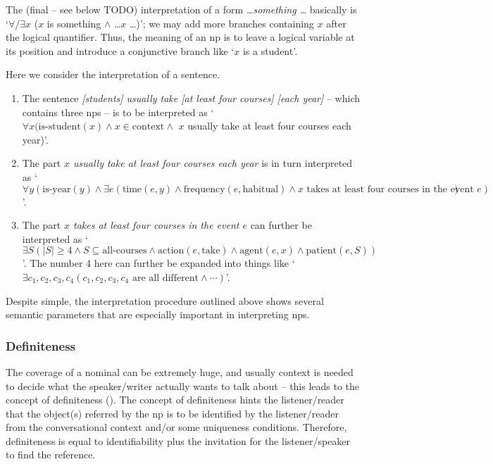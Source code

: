 \documentclass[UTF8, a4paper, oneside, scheme=plain]{ctexrep}
\newcommand{\corpus}[1]{\emph{#1}}
\newcommand{\translate}[1]{`#1'}
\begin{document}
The (final -- see below TODO) 
interpretation of a form \corpus{\dots something \dots} basically is 
\translate{$\forall/\exists x$ ($x$ is something $\land$ \dots $x$ \dots)};
we may add more branches containing $x$ after the logical quantifier.
Thus, the meaning of an \acs{np} 
is to leave a logical variable at its position
and introduce a conjunctive branch like \translate{$x$ is a student}. 

Here we consider the interpretation of a sentence.
\begin{enumerate}
    \item The sentence \corpus{[students] usually take [at least four courses] [each year]}
    -- which contains three \acs{np}s -- 
    is to be interpreted as 
    \translate{$\forall x (
        \text{is-student} (x) \land 
        x \in \text{context} \land$
        $x$ usually take at least four courses each year)}.
    \item The part \corpus{$x$ usually take at least four courses each year} 
    is in turn interpreted as 
    \translate{$\forall y (
        \text{is-year}(y) \land 
        \exists e (
            \text{time}(e, y) \land 
            \text{frequency} (e, \text{habitual}) \land 
            \text{$x$ takes at least four courses in the event $e$})
    )$}.
    \item The part \corpus{$x$ takes at least four courses in the event $e$} 
    can further be interpreted as 
    \translate{$
        \exists S (
            |S| \geq 4 \land 
            S \subseteq \text{all-courses} \land 
            \text{action}(e, \text{take}) \land 
            \text{agent}(e, x) \land 
            \text{patient}(e, S)
        )
    $}.
    The number 4 here can further be expanded into things like 
    \translate{$
        \exists c_1, c_2, c_3, c_4 (
            \text{$c_1, c_2, c_3, c_4$ are all different} \land 
            \cdots
        )
    $}.
\end{enumerate}

Despite simple, the interpretation procedure outlined above 
shows several semantic parameters that are especially important 
in interpreting \acs{np}s.

\subsubsection{Definiteness}

The coverage of a nominal can be extremely huge,
and usually context is needed to decide what the speaker/writer actually wants to talk about -- 
this leads to the concept of definiteness ().
The concept of definiteness hints the listener/reader 
that the object(s) referred by the \acs{np} 
is to be identified by the listener/reader
from the conversational context
and/or some uniqueness conditions.
Therefore, definiteness is equal to identifiability plus 
the invitation for the listener/speaker to find the reference.
\end{document}
